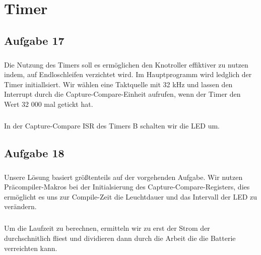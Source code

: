 \chapter{Timer}

\section*{Aufgabe 17}

\paragraph*{}
Die Nutzung des Timers soll es ermöglichen den Knotroller effiktiver zu nutzen indem, auf Endloschleifen verzichtet wird. Im Hauptprogramm wird ledglich der Timer initiallsiert. Wir wählen eine Taktquelle mit 32 kHz und lassen den Interrupt durch die Capture-Compare-Einheit aufrufen, wenn der Timer den Wert 32 000 mal getickt hat. \\



\paragraph*{}
In der Capture-Compare ISR des Timers B schalten wir die LED um. \\



\section*{Aufgabe 18}

\paragraph*{}
Unsere Lösung basiert größtenteils auf der vorgehenden Aufgabe. Wir nutzen Präcompiler-Makros bei der Initialsierung des Capture-Compare-Registers, dies ermöglicht es uns zur Compile-Zeit die Leuchtdauer und das Intervall der LED zu verändern. \\





\paragraph*{}
Um die Laufzeit zu berechnen, ermitteln wir zu erst der Strom der durchschnitlich fliest und dividieren dann durch die Arbeit die die Batterie verreichten kann. 

